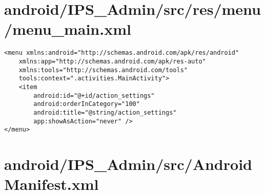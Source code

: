 \section{android/IPS\_Admin/src/res/menu/menu\_main.xml}
\begin{lstlisting}<menu xmlns:android="http://schemas.android.com/apk/res/android"
    xmlns:app="http://schemas.android.com/apk/res-auto"
    xmlns:tools="http://schemas.android.com/tools"
    tools:context=".activities.MainActivity">
    <item
        android:id="@+id/action_settings"
        android:orderInCategory="100"
        android:title="@string/action_settings"
        app:showAsAction="never" />
</menu>
\end{lstlisting}
\newpage
\section{android/IPS\_Admin/src/AndroidManifest.xml}
